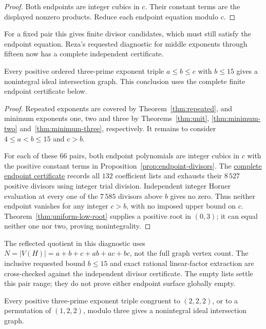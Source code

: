 \begin{proof}
Both endpoints are integer cubics in $c$. Their constant terms are
the displayed nonzero products. Reduce each endpoint equation modulo $c$.
\end{proof}

For a fixed pair this gives finite divisor candidates, which must still
satisfy the endpoint equation. Reza's requested diagnostic for middle
exponents through fifteen now has a complete independent certificate.

\begin{proposition}
\label{cor:middle-fifteen}
Every positive ordered three-prime exponent triple $a\leq b\leq c$
with $b\leq15$ gives a nonintegral ideal intersection graph.
This conclusion uses the complete finite endpoint certificate below.
\end{proposition}

\begin{proof}
Repeated exponents are covered by Theorem~\ref{thm:repeated}, and
minimum exponents one, two and three by Theorems~\ref{thm:unit},
\ref{thm:minimum-two} and~\ref{thm:minimum-three}, respectively.
It remains to consider $4\leq a<b\leq15$ and $c>b$.

For each of these $66$ pairs, both endpoint polynomials are integer
cubics in $c$ with the positive constant terms in
Proposition~\ref{prop:endpoint-divisors}. The
\href{https://github.com/the-omega-institute/ideal-intersection-laplacian/blob/10ff01f0625c7264b8bc5bb33b1a9d7dcb88a93c/results/endpoint-surfaces-verification.json}{complete endpoint certificate}
records all $132$
coefficient lists and exhausts their $8\,527$ positive divisors using
integer trial division. Independent integer Horner evaluation at every
one of the $7\,585$ divisors above $b$ gives no zero. Thus neither
endpoint vanishes for any integer $c>b$, with no imposed upper bound
on $c$. Theorem~\ref{thm:uniform-low-root} supplies a positive root
in $(0,3)$; it can equal neither one nor two, proving nonintegrality.
\end{proof}

The reflected quotient in this diagnostic uses
$N=|V(H)|=a+b+c+ab+ac+bc$, not the full graph vertex count.
The inclusive requested bound $b\leq15$ and exact rational linear-factor
extraction are cross-checked against the independent divisor certificate.
The empty lists settle this pair range; they do not prove either
endpoint surface globally empty.

\begin{proposition}
\label{thm:modulo-three-endpoints}
Every positive three-prime exponent triple congruent to $(2,2,2)$,
or to a permutation of $(1,2,2)$, modulo three gives a nonintegral
ideal intersection graph.
\end{proposition}

